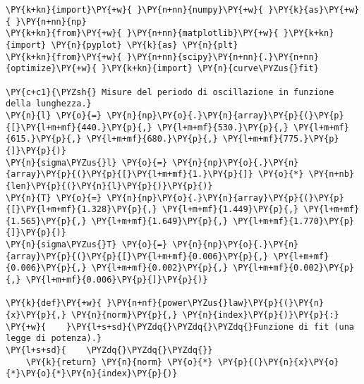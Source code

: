 \begin{Verbatim}[label=\makebox{\href{https://github.com/unipi-physics-labs/lab1-sheets/tree/main/snippy/pendolo_semplice.py}{https://github.com/.../pendolo\_semplice.py}},commandchars=\\\{\}]
\PY{k+kn}{import}\PY{+w}{ }\PY{n+nn}{numpy}\PY{+w}{ }\PY{k}{as}\PY{+w}{ }\PY{n+nn}{np}
\PY{k+kn}{from}\PY{+w}{ }\PY{n+nn}{matplotlib}\PY{+w}{ }\PY{k+kn}{import} \PY{n}{pyplot} \PY{k}{as} \PY{n}{plt}
\PY{k+kn}{from}\PY{+w}{ }\PY{n+nn}{scipy}\PY{n+nn}{.}\PY{n+nn}{optimize}\PY{+w}{ }\PY{k+kn}{import} \PY{n}{curve\PYZus{}fit}

\PY{c+c1}{\PYZsh{} Misure del periodo di oscillazione in funzione della lunghezza.}
\PY{n}{l} \PY{o}{=} \PY{n}{np}\PY{o}{.}\PY{n}{array}\PY{p}{(}\PY{p}{[}\PY{l+m+mf}{440.}\PY{p}{,} \PY{l+m+mf}{530.}\PY{p}{,} \PY{l+m+mf}{615.}\PY{p}{,} \PY{l+m+mf}{680.}\PY{p}{,} \PY{l+m+mf}{775.}\PY{p}{]}\PY{p}{)}
\PY{n}{sigma\PYZus{}l} \PY{o}{=} \PY{n}{np}\PY{o}{.}\PY{n}{array}\PY{p}{(}\PY{p}{[}\PY{l+m+mf}{1.}\PY{p}{]} \PY{o}{*} \PY{n+nb}{len}\PY{p}{(}\PY{n}{l}\PY{p}{)}\PY{p}{)}
\PY{n}{T} \PY{o}{=} \PY{n}{np}\PY{o}{.}\PY{n}{array}\PY{p}{(}\PY{p}{[}\PY{l+m+mf}{1.328}\PY{p}{,} \PY{l+m+mf}{1.449}\PY{p}{,} \PY{l+m+mf}{1.565}\PY{p}{,} \PY{l+m+mf}{1.649}\PY{p}{,} \PY{l+m+mf}{1.770}\PY{p}{]}\PY{p}{)}
\PY{n}{sigma\PYZus{}T} \PY{o}{=} \PY{n}{np}\PY{o}{.}\PY{n}{array}\PY{p}{(}\PY{p}{[}\PY{l+m+mf}{0.006}\PY{p}{,} \PY{l+m+mf}{0.006}\PY{p}{,} \PY{l+m+mf}{0.002}\PY{p}{,} \PY{l+m+mf}{0.002}\PY{p}{,} \PY{l+m+mf}{0.006}\PY{p}{]}\PY{p}{)}

\PY{k}{def}\PY{+w}{ }\PY{n+nf}{power\PYZus{}law}\PY{p}{(}\PY{n}{x}\PY{p}{,} \PY{n}{norm}\PY{p}{,} \PY{n}{index}\PY{p}{)}\PY{p}{:}
\PY{+w}{    }\PY{l+s+sd}{\PYZdq{}\PYZdq{}\PYZdq{}Funzione di fit (una legge di potenza).}
\PY{l+s+sd}{    \PYZdq{}\PYZdq{}\PYZdq{}}
    \PY{k}{return} \PY{n}{norm} \PY{o}{*} \PY{p}{(}\PY{n}{x}\PY{o}{*}\PY{o}{*}\PY{n}{index}\PY{p}{)}


\end{Verbatim}
